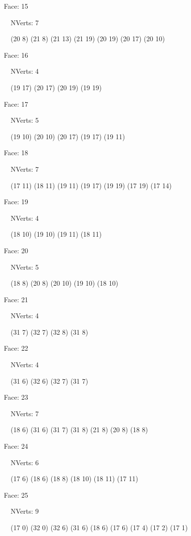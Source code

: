 \documentclass{article}
\begin{document}
{\footnotesize 

Face: 15

\   \    NVerts: 7

 \   \   (20 8) (21 8) (21 13) (21 19) (20 19) (20 17) (20 10)}

{\footnotesize 

Face: 16

\   \    NVerts: 4

 \   \   (19 17) (20 17) (20 19) (19 19)}

{\footnotesize 

Face: 17

\   \    NVerts: 5

 \   \   (19 10) (20 10) (20 17) (19 17) (19 11)}

{\footnotesize 

Face: 18

\   \    NVerts: 7

 \   \   (17 11) (18 11) (19 11) (19 17) (19 19) (17 19) (17 14)}

{\footnotesize 

Face: 19

\   \    NVerts: 4

 \   \   (18 10) (19 10) (19 11) (18 11)}

{\footnotesize 

Face: 20

\   \    NVerts: 5

 \   \   (18 8) (20 8) (20 10) (19 10) (18 10)}

{\footnotesize 

Face: 21

\   \    NVerts: 4

 \   \   (31 7) (32 7) (32 8) (31 8)}

{\footnotesize 

Face: 22

\   \    NVerts: 4

 \   \   (31 6) (32 6) (32 7) (31 7)}

{\footnotesize 

Face: 23

\   \    NVerts: 7

 \   \   (18 6) (31 6) (31 7) (31 8) (21 8) (20 8) (18 8)}

{\footnotesize 

Face: 24

\   \    NVerts: 6

 \   \   (17 6) (18 6) (18 8) (18 10) (18 11) (17 11)}

{\footnotesize 

Face: 25

\   \    NVerts: 9

 \   \   (17 0) (32 0) (32 6) (31 6) (18 6) (17 6) (17 4) (17 2) (17 1)}
\end{document}

